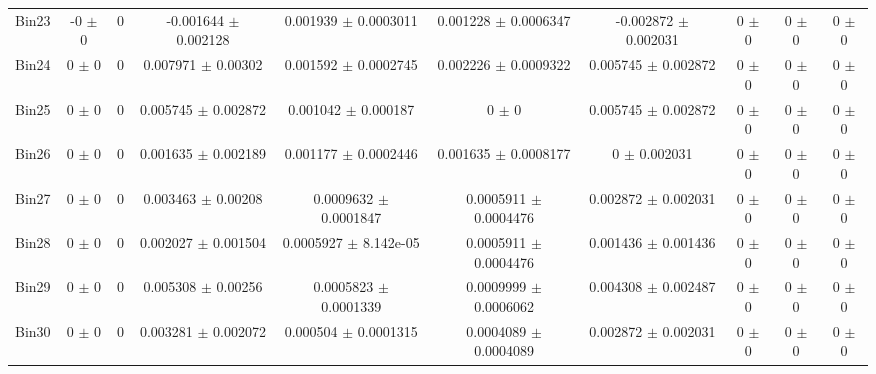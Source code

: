 \begin{tabular}{@{\extracolsep{4pt}}lccccccccc@{}}
     Bin23 & -0 $\pm$ 0 & 0 & -0.001644 $\pm$ 0.002128 & 0.001939 $\pm$ 0.0003011 & 0.001228 $\pm$ 0.0006347 & -0.002872 $\pm$ 0.002031 & 0 $\pm$ 0 & 0 $\pm$ 0 & 0 $\pm$ 0 \\ 
     Bin24 & 0 $\pm$ 0 & 0 & 0.007971 $\pm$ 0.00302 & 0.001592 $\pm$ 0.0002745 & 0.002226 $\pm$ 0.0009322 & 0.005745 $\pm$ 0.002872 & 0 $\pm$ 0 & 0 $\pm$ 0 & 0 $\pm$ 0 \\ 
     Bin25 & 0 $\pm$ 0 & 0 & 0.005745 $\pm$ 0.002872 & 0.001042 $\pm$ 0.000187 & 0 $\pm$ 0 & 0.005745 $\pm$ 0.002872 & 0 $\pm$ 0 & 0 $\pm$ 0 & 0 $\pm$ 0 \\ 
     Bin26 & 0 $\pm$ 0 & 0 & 0.001635 $\pm$ 0.002189 & 0.001177 $\pm$ 0.0002446 & 0.001635 $\pm$ 0.0008177 & 0 $\pm$ 0.002031 & 0 $\pm$ 0 & 0 $\pm$ 0 & 0 $\pm$ 0 \\ 
     Bin27 & 0 $\pm$ 0 & 0 & 0.003463 $\pm$ 0.00208 & 0.0009632 $\pm$ 0.0001847 & 0.0005911 $\pm$ 0.0004476 & 0.002872 $\pm$ 0.002031 & 0 $\pm$ 0 & 0 $\pm$ 0 & 0 $\pm$ 0 \\ 
     Bin28 & 0 $\pm$ 0 & 0 & 0.002027 $\pm$ 0.001504 & 0.0005927 $\pm$ 8.142e-05 & 0.0005911 $\pm$ 0.0004476 & 0.001436 $\pm$ 0.001436 & 0 $\pm$ 0 & 0 $\pm$ 0 & 0 $\pm$ 0 \\ 
     Bin29 & 0 $\pm$ 0 & 0 & 0.005308 $\pm$ 0.00256 & 0.0005823 $\pm$ 0.0001339 & 0.0009999 $\pm$ 0.0006062 & 0.004308 $\pm$ 0.002487 & 0 $\pm$ 0 & 0 $\pm$ 0 & 0 $\pm$ 0 \\ 
     Bin30 & 0 $\pm$ 0 & 0 & 0.003281 $\pm$ 0.002072 & 0.000504 $\pm$ 0.0001315 & 0.0004089 $\pm$ 0.0004089 & 0.002872 $\pm$ 0.002031 & 0 $\pm$ 0 & 0 $\pm$ 0 & 0 $\pm$ 0 \\ 
\hline\hline
  \end{tabular}
